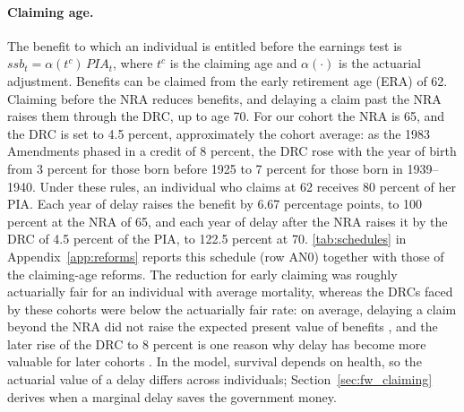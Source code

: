\paragraph{Claiming age.} The benefit to which an individual is entitled before the earnings test is $ssb_t=\alpha(t^c)\,PIA_t$, where $t^c$ is the claiming age and $\alpha(\cdot)$ is the actuarial adjustment. Benefits can be claimed from the early retirement age (ERA) of 62. Claiming before the NRA reduces benefits, and delaying a claim past the NRA raises them through the DRC, up to age 70. For our cohort the NRA is 65, and the DRC is set to 4.5 percent, approximately the cohort average: as the 1983 Amendments phased in a credit of 8 percent, the DRC rose with the year of birth from 3 percent for those born before 1925 to 7 percent for those born in 1939--1940. %
Under these rules, an individual who claims at 62 receives 80 percent of her PIA. Each year of delay raises the benefit by 6.67 percentage points, to 100 percent at the NRA of 65, and each year of delay after the NRA raises it by the DRC of 4.5 percent of the PIA, to 122.5 percent at 70. \autoref{tab:schedules} in Appendix~\ref{app:reforms} reports this schedule (row AN0) together with those of the claiming-age reforms. The reduction for early claiming was roughly actuarially fair for an individual with average mortality, whereas the DRCs faced by these cohorts were below the actuarially fair rate: on average, delaying a claim beyond the NRA did not raise the expected present value of benefits \citep{Coile2002delays}, and the later rise of the DRC to 8 percent is one reason why delay has become more valuable for later cohorts \citep{Shoven2014does}. In the model, survival depends on health, so the actuarial value of a delay differs across individuals; Section~\ref{sec:fw_claiming} derives when a marginal delay saves the government money.

